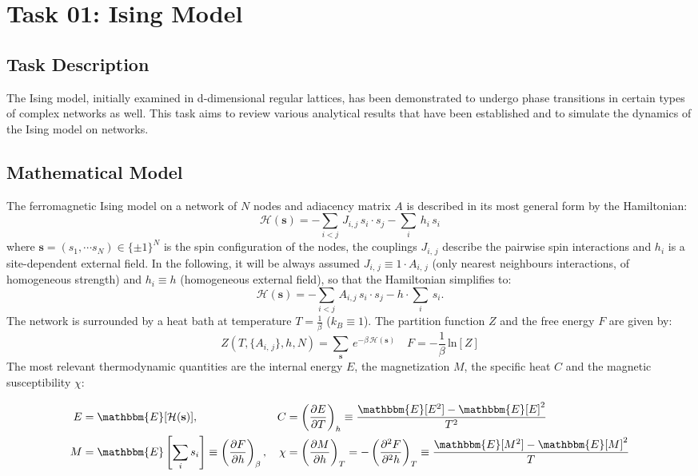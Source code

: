 \chapter{Task 01: Ising Model}
\section{Task Description}
The Ising model, initially examined in d-dimensional regular lattices, has been demonstrated to undergo phase transitions in certain types of complex networks as well. This task aims to review various analytical results that have been established \cite{crit_fen_review} and to simulate the dynamics of the Ising model on networks.
\section{Mathematical Model}
The ferromagnetic Ising model on a network of $N$ nodes and adiacency matrix $A$ is described in its most general form by the Hamiltonian:
\begin{equation*}
    \mathcal{H}(\mathbf{s}) = - \sum_{i < j}\, J_{i,j}\,s_i\cdot s_j - \sum_{i}\, h_i\,s_i
\end{equation*}
where $\mathbf{s} = (s_1, \cdots s_N) \in \{\pm 1\}^N$ is the spin configuration of the nodes, the couplings $J_{i,\,j}$ describe the pairwise spin interactions and $h_i$ is a site-dependent external field.
In the following, it will be always assumed $J_{i,\,j} \equiv 1\cdot A_{i,\,j}$ (only nearest neighbours interactions, of homogeneous strength) and $h_i \equiv h$ (homogeneous external field), so that the Hamiltonian simplifies to:
\begin{equation}
        \mathcal{H}(\mathbf{s}) = - \sum_{i < j}\, A_{i,j}\,s_i\cdot s_j - h\cdot \sum_{i}\,s_i.
        \label{eq:ising_Hamiltonian}
\end{equation}
The network is surrounded by a heat bath at temperature $T = \frac{1}{\beta} $ ($k_B \equiv 1$). The partition function $Z$ and the free energy $F$ are given by:
\begin{equation*}
    Z\left(T, \{A_{i,\,j}\}, h, N\right) = \sum_{\mathbf{s}}\, e^{-\beta\, \mathcal{H}(\mathbf{s})} \quad F = -\frac{1}{\beta}\, \text{ln}[Z]
\end{equation*}
The most relevant thermodynamic quantities are the internal energy $E$, the magnetization $M$, the specific heat $C$ and the magnetic susceptibility $\chi$:

\begin{align*}
E &= \mathbbm{E}[\mathcal{H}(\mathbf{s})], &
C &= \left( \frac{\partial E}{\partial T} \right)_{h} \equiv \frac{\mathbbm{E}[E^2] - \mathbbm{E}[E]^2}{T^2} \\
M &= \mathbbm{E}\left[\sum_{i} s_i \right] \equiv \left( \frac{\partial F}{\partial h} \right)_{\beta}, &
\chi &= \left( \frac{\partial M}{\partial h} \right)_{T} = -\left( \frac{\partial^2 F}{\partial^2 h} \right)_{T} \equiv \frac{\mathbbm{E}[M^2] - \mathbbm{E}[M]^2}{T}
\end{align*}


